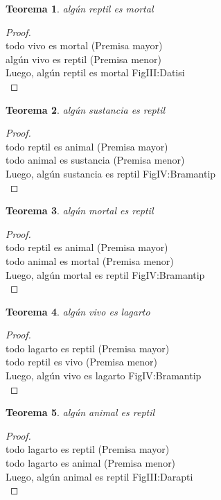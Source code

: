 ﻿\documentclass[12pt]{book}
\newtheorem{theorem}{Teorema}[chapter]
\newtheorem{proof}{Demostración}
\begin{document}
\begin{theorem}
algún reptil es mortal
\label{th: 74}
\end{theorem}\begin{proof}\\todo vivo es mortal	 (Premisa mayor) \\algún vivo es reptil	 (Premisa menor) \\Luego, algún reptil es mortal	FigIII:Datisi \\ \end{proof}
\begin{theorem}
algún sustancia es reptil
\label{th: 75}
\end{theorem}\begin{proof}\\todo reptil es animal	 (Premisa mayor) \\todo animal es sustancia	 (Premisa menor) \\Luego, algún sustancia es reptil	FigIV:Bramantip \\ \end{proof}
\begin{theorem}
algún mortal es reptil
\label{th: 76}
\end{theorem}\begin{proof}\\todo reptil es animal	 (Premisa mayor) \\todo animal es mortal	 (Premisa menor) \\Luego, algún mortal es reptil	FigIV:Bramantip \\ \end{proof}
\begin{theorem}
algún vivo es lagarto
\label{th: 77}
\end{theorem}\begin{proof}\\todo lagarto es reptil	 (Premisa mayor) \\todo reptil es vivo	 (Premisa menor) \\Luego, algún vivo es lagarto	FigIV:Bramantip \\ \end{proof}
\begin{theorem}
algún animal es reptil
\label{th: 78}
\end{theorem}\begin{proof}\\todo lagarto es reptil	 (Premisa mayor) \\todo lagarto es animal	 (Premisa menor) \\Luego, algún animal es reptil	FigIII:Darapti \\ \end{proof}
\end{document}

